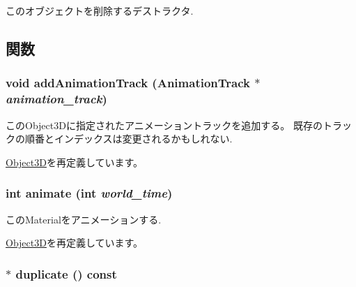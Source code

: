 このオブジェクトを削除するデストラクタ. 

\subsection{関数}
\hypertarget{classm3g_1_1Material_415c0b110f95410ded9b85e5d99a496b}{
\subsubsection[{addAnimationTrack}]{\setlength{\rightskip}{0pt plus 5cm}void addAnimationTrack ({\bf AnimationTrack} $\ast$ {\em animation\_\-track})}}
\label{classm3g_1_1Material_415c0b110f95410ded9b85e5d99a496b}


このObject3Dに指定されたアニメーショントラックを追加する。 既存のトラックの順番とインデックスは変更されるかもしれない. 

\hyperlink{classm3g_1_1Object3D_415c0b110f95410ded9b85e5d99a496b}{Object3D}を再定義しています。\hypertarget{classm3g_1_1Material_8aad1ceab4c2a03609c8a42324ce484d}{
\subsubsection[{animate}]{\setlength{\rightskip}{0pt plus 5cm}int animate (int {\em world\_\-time})}}
\label{classm3g_1_1Material_8aad1ceab4c2a03609c8a42324ce484d}


このMaterialをアニメーションする. 

\hyperlink{classm3g_1_1Object3D_8aad1ceab4c2a03609c8a42324ce484d}{Object3D}を再定義しています。\hypertarget{classm3g_1_1Material_1bdbc2f934efac291bf7d8f49ba10dda}{
\subsubsection[{duplicate}]{ $\ast$ duplicate () const}}
\label{classm3g_1_1Material_1bdbc2f934efac291bf7d8f49ba10dda}


